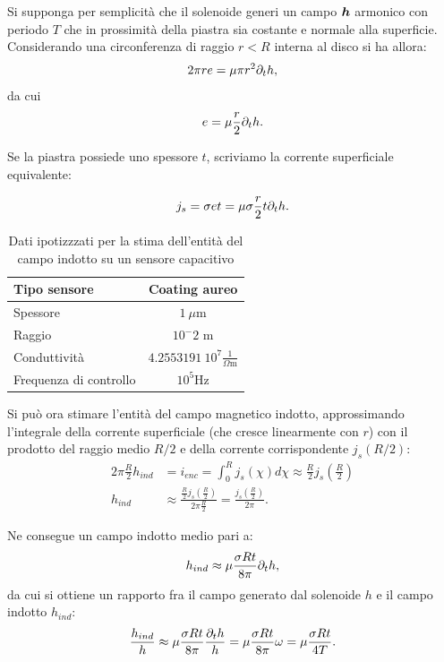 Si supponga per semplicità che il solenoide generi un campo $\boldsymbol{h}$ armonico con periodo $T$ che in prossimità della piastra sia costante e normale alla superficie. Considerando una circonferenza di raggio $r<R$ interna al disco si ha allora:
\begin{equation}
\label{eq:4es1}
2\pi r e = \mu \pi r^2 \partial_t h,
\end{equation}
da cui
\begin{equation}
\label{eq:4es2}
e = \mu \frac{r}{2} \partial_t h.
\end{equation}

Se la piastra possiede uno spessore $t$, scriviamo la corrente superficiale equivalente:

\begin{equation}
\label{eq:4es3}
j_s = \sigma e t = \mu \sigma \frac{r}{2} t \partial_t h.
\end{equation}

\begin{table}
\centering
\caption{Dati ipotizzzati per la stima dell'entità del campo indotto su un sensore capacitivo} \label{tab:4daties}
\begin{tabular}{lc}
\toprule
Tipo sensore & Coating aureo\\
\midrule
Spessore & $1~\mu\text{m}$\\
Raggio & $10^-2$ m\\
Conduttività & $4.2553191~10^7 \frac{1}{\Omega\text{m}}$\\
Frequenza di controllo & $10^5 \text{Hz}$\\
\bottomrule
\end{tabular}
\end{table}
Si può ora stimare l'entità del campo magnetico indotto, approssimando l'integrale della corrente superficiale (che cresce linearmente con $r$) con il prodotto del raggio medio $R/2$ e della corrente corrispondente $j_s(R/2)$:
\begin{align}
\label{eq:4es4}
2\pi \frac{R}{2} h_{ind} &= i_{enc} = \int_0^R j_s(\chi) d\chi \approx \frac{R}{2} j_s (\frac{R}{2})\\
\label{eq:4es5}
h_{ind} &\approx\frac{\frac{R}{2} j_s (\frac{R}{2})}{2\pi \frac{R}{2}} = \frac{j_s(\frac{R}{2})}{2 \pi}.
\end{align}

Ne consegue un campo indotto medio pari a:
\begin{equation}
\label{eq:4es6}
h_{ind} \approx \mu \frac{ \sigma R t}{8\pi} \partial_t h,
\end{equation}
da cui si ottiene un rapporto fra il campo generato dal solenoide $h$ e il campo indotto $h_{ind}$:
\begin{equation}
\label{eq:4es6bis}
\frac{h_{ind}}{h} \approx \mu \frac{ \sigma R t}{8\pi} \frac{\partial_t h}{h} = \mu \frac{ \sigma R t}{8\pi} \omega = \mu \frac{ \sigma R t}{4T}.
\end{equation}

